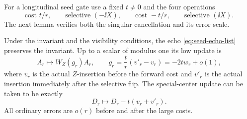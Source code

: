 For a longitudinal seed gate use a fixed \(t\neq0\) and the four
operations
\begin{equation}
\label{eq:seed-echo-list}
 \text{cost }t/r,\qquad
 \text{selective }(-\ii X),\qquad
 \text{cost }-t/r,\qquad
 \text{selective }(\ii X).
\end{equation}
The next lemma verifies both the singular cancellation and its error
scale.

\begin{lemma}
\label{lem:seed-one-echo}
Under the invariant and the visibility conditions, the echo
\eqref{eq:seed-echo-list} preserves the invariant.  Up to a scalar of
modulus one its low update is
\begin{equation}
\label{eq:seed-echo-low}
 A_r\longmapsto W_Z(g_r)A_r,
 \qquad
 g_r=\frac{t}{r}(v'_r-v_r)=-2t w_r+o(1),
\end{equation}
where \(v_r\) is the actual \(Z\)-insertion before the forward cost
and \(v'_r\) is the actual insertion immediately after the selective
flip.  The special-center update can be taken to be exactly
\begin{equation}
\label{eq:seed-D-update}
 D_r\longmapsto D_r-t(v_r+v'_r).
\end{equation}
All ordinary errors are \(o(r)\) before and after the large costs.
\end{lemma}

